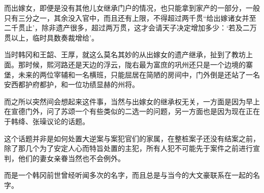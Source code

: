而出嫁女，即便是没有其他儿女继承门户的情况，也只能拿到家产的一部分，一般只有三分之一，其余没入官中，而且还有上限，不得超过两千贯“给出嫁诸女并至二千贯止’，除非遗产很多，超过两万贯，这才会请天子决定增加多少：‘若及二万贯以上，临时具数奏裁增给’。

当时韩冈和王韶、王厚，就这么莫名其妙的从出嫁女的遗产继承，扯到了教坊上面。那时候，熙河路还是天边的浮云，陇右最为富庶的巩州还只是一个边境的寨堡，未来的两位宰辅和一名横班，只能屈居在简陋的房间中，门外倒是还站了一名安西都护府都护，和一位功绩显赫的州将。

而之所以突然间会想起来这件事，当然与出嫁女的继承权无关，一方面是因为早上在宣德门外，问了苏颂一个有些类似的二选一的问题，另一方面也是因为现在正在于韩绛、张璪议论的话题。

这个话题并非是如何处置大逆案与案犯官们的家属，在整桩案子还没有结案之前，除了那几个为了安定人心而特旨处置的主犯，所有人犯不可能先于案件之前进行宣判，他们的妻女亲眷当然也不会例外。

而是一个韩冈前世曾经听闻多次的名字，而且总是与当今的大文豪联系在一起的名字。

